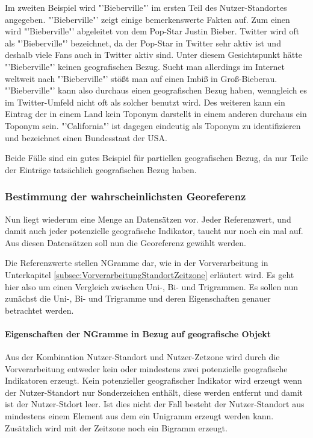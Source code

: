 						Im zweiten Beispiel wird "'Bieberville"' im ersten Teil des Nutzer-Standortes angegeben. 
						"'Bieberville"' zeigt einige bemerkenswerte Fakten auf.
						Zum einen wird "'Bieberville"' abgeleitet von dem Pop-Star Justin Bieber.	
						Twitter wird oft als "'Bieberville"' bezeichnet, da der Pop-Star in Twitter sehr aktiv ist und deshalb viele Fans auch in Twitter aktiv sind.
						Unter diesem Gesichtspunkt hätte "'Bieberville"' keinen geografischen Bezug.
						Sucht man allerdings im Internet weltweit nach "'Bieberville"' stößt man auf einen Imbiß in Groß-Bieberau.
						"'Bieberville"' kann also durchaus einen geografischen Bezug haben, wenngleich es im Twitter-Umfeld nicht oft als solcher benutzt wird. 
						Des weiteren kann ein Eintrag der in einem Land kein Toponym darstellt in einem anderen durchaus ein Toponym sein.
 						"'California"' ist dagegen eindeutig als Toponym zu identifizieren und bezeichnet einen Bundesstaat der USA.

						Beide Fälle sind ein gutes Beispiel für partiellen geografischen Bezug, da nur Teile der Einträge tatsächlich geografischen Bezug haben. 





\subsubsection{Bestimmung der wahrscheinlichsten Georeferenz} 

				Nun liegt wiederum eine Menge an Datensätzen vor.
				Jeder Referenzwert, und damit auch jeder potenzielle geografische Indikator, taucht nur noch ein mal auf. 
				Aus diesen Datensätzen soll nun die Georeferenz gewählt werden. 

				Die Referenzwerte stellen NGramme dar, wie in der Vorverarbeitung in Unterkapitel \ref{subsec:VorverarbeitungStandortZeitzone} erläutert wird.
				Es geht hier also um einen Vergleich zwischen Uni-, Bi- und Trigrammen.
				Es sollen nun zunächst die Uni-, Bi- und Trigramme und deren Eigenschaften genauer betrachtet werden.


				\paragraph{Eigenschaften der NGramme in Bezug auf geografische Objekt}

					Aus der Kombination Nutzer-Standort und Nutzer-Zetzone wird durch die Vorverarbeitung entweder kein oder mindestens zwei potenzielle geografische Indikatoren erzeugt.
					Kein potenzieller geografischer Indikator wird erzeugt wenn der Nutzer-Standort nur Sonderzeichen enthält, diese werden entfernt und damit ist der Nutzer-Stdort leer.
					Ist dies nicht der Fall besteht der Nutzer-Standort aus mindestens einem Element aus dem ein Unigramm erzeugt werden kann.
					Zusätzlich wird mit der Zeitzone noch ein Bigramm erzeugt.

